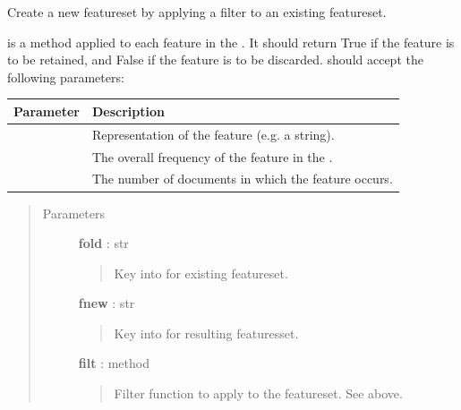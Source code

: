 \documentclass[letterpaper,10pt,english]{sphinxmanual}
\begin{document}
\begin{fulllineitems}
\begin{fulllineitems}
\end{fulllineitems}


\begin{fulllineitems}
\label{tethne.classes.corpus:tethne.classes.corpus.Corpus.filter_features}
Create a new featureset by applying a filter to an existing featureset.

 is a method applied to each feature in the {\hyperref[tethne.classes.corpus:tethne.classes.corpus.Corpus]{}}.
It should return True if the feature is to be retained, and False if the
feature is to be discarded.  should accept the following
parameters:

\begin{tabulary}{\linewidth}{|L|L|}
\hline
\textsf{\relax 
Parameter
} & \textsf{\relax 
Description
}\\
\hline
{}
 & 
Representation of the feature (e.g. a string).
\\

 & 
The overall frequency of the feature in the
{\hyperref[tethne.classes.corpus:tethne.classes.corpus.Corpus]{}}.
\\

 & 
The number of documents in which the feature occurs.
\\
\hline\end{tabulary}

\begin{quote}\begin{description}
\item[{Parameters}] \leavevmode
\textbf{fold} : str
\begin{quote}

Key into  for existing featureset.
\end{quote}

\textbf{fnew} : str
\begin{quote}

Key into  for resulting featuresset.
\end{quote}

\textbf{filt} : method
\begin{quote}

Filter function to apply to the featureset. See above.
\end{quote}


\end{description}
\end{quote}
\end{fulllineitems}
\end{fulllineitems}
\end{document}
